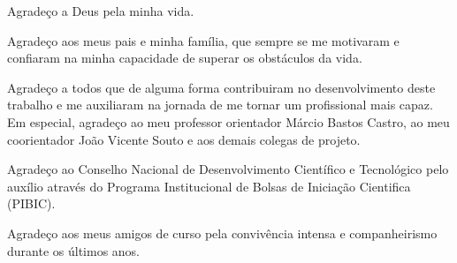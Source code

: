 \begin{agradecimentos}
  Agradeço a Deus pela minha vida.
  
  Agradeço aos meus pais e minha família, que sempre se me motivaram e confiaram na minha capacidade de superar os obstáculos da vida.
  
  Agradeço a todos que de alguma forma contribuiram no desenvolvimento deste trabalho e me auxiliaram na jornada de me tornar um profissional mais capaz. Em especial, agradeço ao meu professor orientador Márcio Bastos Castro, ao meu coorientador João Vicente Souto e aos demais colegas de projeto. 
  
  Agradeço ao Conselho Nacional de Desenvolvimento Científico e Tecnológico pelo auxílio através do Programa Institucional de Bolsas de Iniciação Cientifica (PIBIC).
  
  Agradeço aos meus amigos de curso pela convivência intensa e companheirismo durante os últimos anos.
  
\end{agradecimentos}